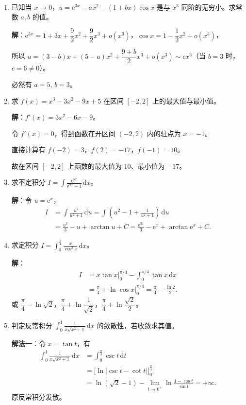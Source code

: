 \documentclass[a4paper,11pt]{ctexart}
\newcommand{\dd}{\,\mathrm{d}}
\newcommand{\e}{\mathrm{e}}
\begin{document}
\begin{enumerate}[label=\arabic*., start=11, leftmargin=2em, itemsep=0.9em, topsep=0.5em]
  \item 已知当 $x\to 0$，$u=\e^{3x}-ax^2-(1+bx)\cos x$ 是与 $x^3$ 同阶的无穷小。求常数 $a,b$ 的值。

  \textbf{解}：$\e^{3x}=1+3x+\dfrac{9}{2}x^2+\dfrac{9}{2}x^3+o(x^3)$，$\cos x=1-\dfrac{1}{2}x^2+o(x^3)$，

  所以 $u=(3-b)x+(5-a)x^2+\dfrac{9+b}{2}x^3+o(x^3)\sim cx^3$（当 $b=3$ 时，$c=6\neq 0$）。

  必然有 $a=5,\,b=3$。

  \item 求 $f(x)=x^3-3x^2-9x+5$ 在区间 $[-2,2]$ 上的最大值与最小值。

  \textbf{解}：$f'(x)=3x^2-6x-9$。

  令 $f'(x)=0$，得到函数在开区间 $(-2,2)$ 内的驻点为 $x=-1$。

  直接计算有 $f(-2)=3$，$f(2)=-17$，$f(-1)=10$。

  故在区间 $[-2,2]$ 上函数的最大值为 $10$、最小值为 $-17$。

  \item 求不定积分 $I=\displaystyle\int\frac{\e^{5x}}{\e^{2x}+1}\dd x$。

  \textbf{解}：令 $u=\e^x$，
  \begin{align*}
    I &= \int\frac{u^4}{u^2+1}\dd u = \int\left(u^2-1+\frac{1}{u^2+1}\right)\dd u \\
      &= \frac{u^3}{3}-u+\arctan u+C = \frac{\e^{3x}}{3}-\e^x+\arctan\e^x+C.
  \end{align*}

  \item 求定积分 $I=\displaystyle\int_0^{\frac{\pi}{4}}\frac{x}{\cos^2 x}\dd x$。

  \textbf{解}：
  \begin{align*}
    I &= \left.x\tan x\right|_0^{\pi/4} - \int_0^{\pi/4}\tan x\dd x \\
      &= \frac{\pi}{4} + \left.\ln\cos x\right|_0^{\pi/4} = \frac{\pi}{4} - \frac{\ln 2}{2}.
  \end{align*}
  或 $\dfrac{\pi}{4}-\ln\sqrt{2}$，$\dfrac{\pi}{4}+\ln\dfrac{1}{\sqrt{2}}$，$\dfrac{\pi}{4}+\ln\dfrac{\sqrt{2}}{2}$。

  \item 判定反常积分 $\displaystyle\int_0^1\frac{1}{x\sqrt{x^2+1}}\dd x$ 的敛散性，若收敛求其值。

  \textbf{解法一}：令 $x=\tan t$，有
  \begin{align*}
    \int_0^1\frac{1}{x\sqrt{x^2+1}}\dd x
    &= \int_0^{\frac{\pi}{4}}\csc t\dd t \\
    &= \bigl[\ln|\csc t-\cot t|\bigr]_{0^+}^{\frac{\pi}{4}} \\
    &= \ln(\sqrt{2}-1) - \lim_{t\to 0^+}\ln\frac{1-\cos t}{\sin t} = +\infty.
  \end{align*}
  原反常积分发散。


\end{enumerate}
\end{document}
